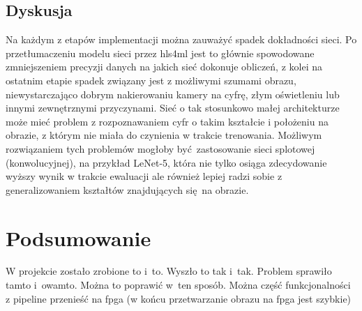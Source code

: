 \documentclass[12pt, oneside, a4paper]{article}
\begin{document}
\subsection{Dyskusja}
Na każdym z etapów implementacji można zauważyć spadek dokładności sieci.
Po przetłumaczeniu modelu sieci przez hls4ml jest to głównie spowodowane
zmniejszeniem precyzji danych na jakich sieć dokonuje obliczeń, z kolei
na ostatnim etapie spadek związany jest z możliwymi szumami obrazu,
niewystarczająco dobrym nakierowaniu kamery na cyfrę, złym oświetleniu lub
innymi zewnętrznymi przyczynami. Sieć o tak stosunkowo małej architekturze
może mieć problem z rozpoznawaniem cyfr o takim kształcie i położeniu
na obrazie, z którym nie miała do czynienia w trakcie trenowania.
Możliwym rozwiązaniem tych problemów mogłoby być zastosowanie sieci
splotowej (konwolucyjnej), na przykład \mbox{LeNet-5}, która nie tylko
osiąga zdecydowanie wyższy wynik w trakcie ewaluacji ale również lepiej
radzi sobie z generalizowaniem kształtów znajdujących się na obrazie.


\newpage
\section{Podsumowanie}
W projekcie zostało zrobione to i~to. Wyszło to tak i~tak. Problem sprawiło
tamto i~owamto. Można to poprawić w~ten sposób. Można część funkcjonalności
z pipeline przenieść na fpga (w końcu przetwarzanie obrazu na fpga jest szybkie)
\end{document}
